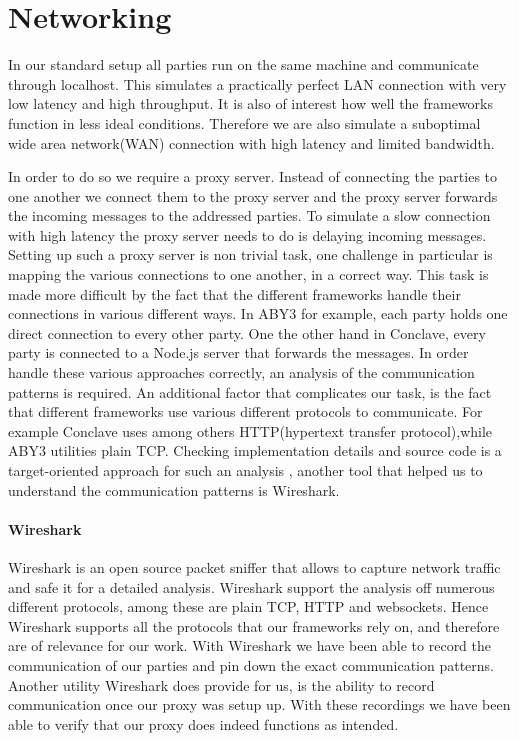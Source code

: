 \section{Networking}
In our standard setup all parties run on the same machine and communicate through localhost. This simulates a practically perfect LAN connection with very low latency and high throughput. It is also of interest how well the frameworks function in less ideal conditions. Therefore we are also simulate a suboptimal wide area network(WAN) connection with high latency and limited bandwidth.

In order to do so we require a proxy server. Instead of connecting the parties to one another we connect them to the proxy server and the proxy server forwards the incoming messages to the addressed parties. To simulate a slow connection with high latency the proxy server needs to do is delaying incoming messages. Setting up such a proxy server is non trivial task, one challenge in particular is mapping the various connections to one another, in a correct way. This task is made more difficult by the fact that the different frameworks handle their connections in various different ways. In ABY3 for example, each party holds one direct connection to every other party. One the other hand in Conclave, every party is connected to a Node.js server that forwards the messages. In order handle these various approaches correctly, an analysis of the communication patterns is required. An additional factor that complicates our task, is the fact that different frameworks use various different protocols to communicate. For example Conclave uses among others HTTP(hypertext transfer protocol),while ABY3 utilities plain TCP. Checking implementation details and source code is a target-oriented approach for such an analysis , another tool that helped us to understand the communication patterns is Wireshark.      
\paragraph{Wireshark}
Wireshark \cite{wireshark} is an open source packet sniffer that allows to capture network traffic and safe it for a detailed analysis. Wireshark support the analysis off numerous different protocols, among these are plain TCP, HTTP and websockets. Hence Wireshark supports all the protocols that our frameworks rely on, and therefore are of relevance for our work. With Wireshark we have been able to record the communication of our parties and pin down the exact communication patterns. Another utility Wireshark does provide for us, is the ability to record communication once our proxy was setup up. With these recordings we have been able to verify that our proxy does indeed functions as intended.                  

